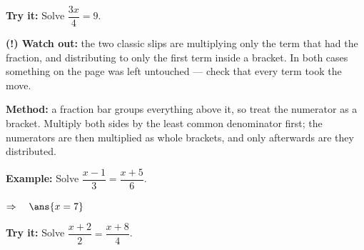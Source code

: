 \documentclass[12pt]{article}
\begin{document}
\begin{tryitbox}
\textbf{Try it:} \quad Solve $\dfrac{3x}{4} = 9$.\\[2pt]
\end{tryitbox}

\begin{watchoutbox}
\textbf{(!) Watch out:} the two classic slips are multiplying only the term that had the
fraction, and distributing to only the first term inside a bracket. In both cases something
on the page was left untouched --- check that every term took the move.
\end{watchoutbox}


\begin{formulabox}
\textbf{Method:} a fraction bar groups everything above it, so treat the numerator as a
bracket. Multiply both sides by the least common denominator first; the numerators are
then multiplied as whole brackets, and only afterwards are they distributed.
\end{formulabox}

\begin{examplebox}
\textbf{Example:} \quad Solve $\dfrac{x - 1}{3} = \dfrac{x + 5}{6}$.

$\Rightarrow\quad \ans{x = 7}$
\end{examplebox}

\begin{tryitbox}
\textbf{Try it:} \quad Solve $\dfrac{x + 2}{2} = \dfrac{x + 8}{4}$.\\[2pt]
\end{tryitbox}
\end{document}
